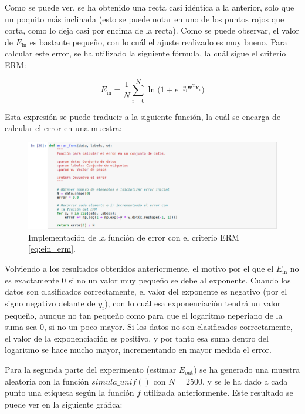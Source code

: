 \documentclass[11pt,a4paper]{article}
\newcommand{\eout}{$E_{\text{out}}$}
\newcommand{\ein}{$E_{\text{in}}$}
\begin{document}
Como se puede ver, se ha obtenido una recta casi idéntica a la anterior, solo que un poquito más
inclinada (esto se puede notar en uno de los puntos rojos que corta, como lo deja casi por encima de
la recta). Como se puede observar, el valor de \ein{} es bastante pequeño, con lo cuál el ajuste
realizado es muy bueno.  Para calcular este error, se ha utilizado la siguiente fórmula, la cuál
sigue el criterio ERM:

\begin{equation}
	\label{eq:ein_erm}
	E_{\text{in}} = \frac{1}{N}
	\sum_{i = 0}^N \ln \Big( 1 + e^{-y_i\mathbf{w}^\text{T}\mathbf{x}_i}  \Big)
\end{equation}

Esta expresión se puede traducir a la siguiente función, la cuál se encarga de calcular el error en
una muestra:

\begin{figure}[H]
\centering
\includegraphics[scale=0.4]{img/error_func.png}
\caption{Implementación de la función de error con el criterio ERM \eqref{eq:ein_erm}.}
\end{figure}

Volviendo a los resultados obtenidos anteriormente, el motivo por el que el \ein{} no es exactamente 0
si no un valor muy pequeño se debe al exponente.
Cuando los datos son clasificados correctamente, el valor del exponente es negativo (por el signo
negativo delante de $y_i$), con lo cuál esa exponenciación tendrá un valor pequeño, aunque no tan
pequeño como para que el logaritmo neperiano de la suma sea 0, si no un poco mayor. Si los datos
no son clasificados correctamente, el valor de la exponenciación es positivo, y por tanto esa
suma dentro del logaritmo se hace mucho mayor, incrementando en mayor medida el error.

Para la segunda parte del experimento (estimar \eout{}) se ha generado una muestra aleatoria con la
función $simula\_unif()$ con $N = 2500$, y se le ha dado a cada punto una etiqueta según la función
$f$ utilizada anteriormente. Este resultado se puede ver en la siguiente gráfica:
\end{document}
